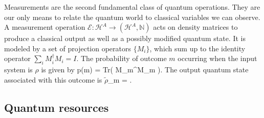 \documentclass[aps,11pt,twoside,letterpaper]{article}
\def\Tr{\textup{Tr}}
\def\E{\mathcal{E}}
\def\cH{\mathcal{H}}
\def\NN{\mathbb{N}}
\newcommand{\rhot}{{\ensuremath{\tilde{\rho}}}}
\begin{document}

				
			Measurements are the second fundamental class of quantum operations. 
			They are our only means to relate the quantum world to classical variables we can observe.
			A measurement operation $\E\!\!:\!\!\cH^A \to (\cH^A,\NN)$ acts on density matrices to produce a classical
			output as well as a possibly modified quantum state.
			It is modeled by a set of projection operators $\{M_i\}$, which sum up to the identity operator 
			$\sum_i M_i^\dag M_i = I$.
			The probability of outcome $m$ occurring when the input system is $\rho$ is given by
			\be
				p(m)	=	\Tr\!\left( M_m^\dag \rho M_m \right).
			\ee
			The output quantum state associated with this outcome is
			\be
				 \rhot_m	=  \frac{M_m^\dag \rho M_m}{	\Tr\!\left( M_m^\dag \rho M_m \right)	}.
			\ee
			


		\bigskip
		\subsection{Quantum resources}	\label{subsection:quantum-resources}
		
\end{document}
